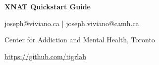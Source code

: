 \documentclass[a4paper,11pt,oneside]{book}
\begin{document}


\noindent
\begin{minipage}{\textwidth}

    \vspace{0.1in} 
    \begin{multicols}{2}
        
		\vspace*{\fill}
		\large\textbf{XNAT Quickstart Guide}
		\vspace*{\fill}

        \columnbreak
        \normalsize

        \hfill joseph@viviano.ca | joseph.viviano@camh.ca

        \hfill Center for Addiction and Mental Health, Toronto\
        
        \hfill \url{https://github.com/tigrlab}\

    \end{multicols}
    \vspace{0in}
\end{minipage}
\end{document}

